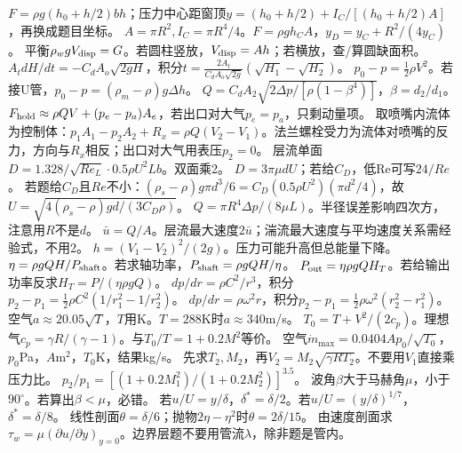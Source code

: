 $F=\rho g(h_0+h/2)bh$；压力中心距窗顶$y=(h_0+h/2)+I_C/[(h_0+h/2)A]$，再换成题目坐标。
$A=\pi R^2,I_C=\pi R^4/4$。$F=\rho gh_CA$，$y_D=y_C+R^2/(4y_C)$。
平衡$\rho_w gV_{\rm disp}=G$。若圆柱竖放，$V_{\rm disp}=Ah$；若横放，查/算圆缺面积。
$A_t dH/dt=-C_dA_o\sqrt{2gH}$，积分$t=\frac{2A_t}{C_dA_o\sqrt{2g}}(\sqrt{H_1}-\sqrt{H_2})$。
$p_0-p=\frac12\rho V^2$。若接U管，$p_0-p=(\rho_m-\rho)g\Delta h$。
$Q=C_dA_2\sqrt{2\Delta p/[\rho(1-\beta^4)]}$，$\beta=d_2/d_1$。
$F_{\rm hold}\approx\rho QV+(p_e-p_a)A_e$，若出口对大气$p_e=p_a$，只剩动量项。
取喷嘴内流体为控制体：$p_1A_1-p_2A_2+R_x=\rho Q(V_2-V_1)$。法兰螺栓受力为流体对喷嘴的反力，方向与$R_x$相反；出口对大气用表压$p_2=0$。
层流单面$D=1.328/\sqrt{Re_L}\cdot0.5\rho U^2Lb$。双面乘2。
$D=3\pi\mu dU$；若给$C_D$，低Re可写$24/Re$。
若题给$C_D$且$Re$不小：$(\rho_s-\rho)g\pi d^3/6=C_D(0.5\rho U^2)(\pi d^2/4)$，故$U=\sqrt{4(\rho_s-\rho)gd/(3C_D\rho)}$。
$Q=\pi R^4\Delta p/(8\mu L)$。半径误差影响四次方，注意用$R$不是$d$。
$\bar u=Q/A$。层流最大速度$2\bar u$；湍流最大速度与平均速度关系需经验式，不用2。
$h=(V_1-V_2)^2/(2g)$。压力可能升高但总能量下降。
$\eta=\rho gQH/P_{\rm shaft}$。若求轴功率，$P_{\rm shaft}=\rho gQH/\eta$。
$P_{\rm out}=\eta\rho gQH_T$。若给输出功率反求$H_T=P/(\eta\rho gQ)$。
$dp/dr=\rho C^2/r^3$，积分$p_2-p_1=\frac12\rho C^2(1/r_1^2-1/r_2^2)$。
$dp/dr=\rho\omega^2r$，积分$p_2-p_1=\frac12\rho\omega^2(r_2^2-r_1^2)$。
空气$a\approx20.05\sqrt{T}$，$T$用K。$T=288$K时$a\approx340$m/s。
$T_0=T+V^2/(2c_p)$。理想气$c_p=\gamma R/(\gamma-1)$。与$T_0/T=1+0.2M^2$等价。
空气$\dot m_{\max}=0.0404A p_0/\sqrt{T_0}$，$p_0$Pa，$A$m$^2$，$T_0$K，结果kg/s。
先求$T_2,M_2$，再$V_2=M_2\sqrt{\gamma RT_2}$。不要用$V_1$直接乘压力比。
$p_2/p_1=[(1+0.2M_1^2)/(1+0.2M_2^2)]^{3.5}$。
波角$\beta$大于马赫角$\mu$，小于$90^\circ$。若算出$\beta<\mu$，必错。
若$u/U=y/\delta$，$\delta^*=\delta/2$。若$u/U=(y/\delta)^{1/7}$，$\delta^*=\delta/8$。
线性剖面$\theta=\delta/6$；抛物$2\eta-\eta^2$时$\theta=2\delta/15$。
由速度剖面求$\tau_w=\mu(\partial u/\partial y)_{y=0}$。边界层题不要用管流$\lambda$，除非题是管内。
